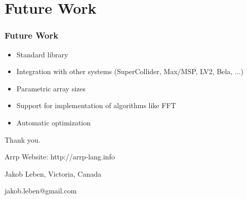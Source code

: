 \documentclass{beamer}
\begin{document}
\section{Future Work}

\begin{frame}[fragile]
\frametitle{Future Work}

\begin{itemize}
\item Standard library
\item Integration with other systems (SuperCollider, Max/MSP, LV2, Bela, ...)
\item Parametric array sizes
\item Support for implementation of algorithms like FFT
\item Automatic optimization
\end{itemize}

\end{frame}

\begin{frame}[fragile]

\centering

Thank you.

\vspace{15pt}

Arrp Website: http://arrp-lang.info

\vspace{30pt}

Jakob Leben, Victoria, Canada

jakob.leben@gmail.com

\end{frame}
\end{document}
